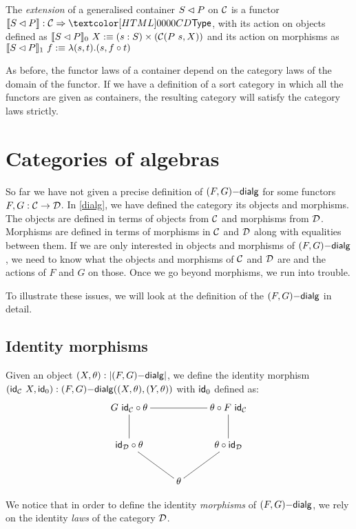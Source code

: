 \begin{definition}
  The \emph{extension} of a generalised container $S \lhd P$ on
  $\mathcal{C}$ is a functor $\context{\cont{S}{P}} : \Func{\Cc}{\Type}$, with
  its action on objects defined as
  $\llbracket S \lhd P \rrbracket_0\ X :\equiv (s : S) \times (\mathcal{C}(P\ s, X))$
  and its action on morphisms as
  $\llbracket S \lhd P \rrbracket_1\ f :\equiv \lambda (s , t) . (s , f \circ
  t)$
\end{definition}

As before, the functor laws of a container depend on the category laws
of the domain of the functor. If we have a definition of a sort
category in which all the functors are given as containers, the
resulting category will satisfy the category laws strictly.


\section{Categories of algebras}

So far we have not given a precise definition of $(F,G)\mathsf{-dialg}$ for
some functors $F, G : \mathcal{C} \to \mathcal{D}$. In \cref{dialg}, we have defined
the category its objects and morphisms. The objects are defined in
terms of objects from $\mathcal{C}$ and morphisms from $\mathcal{D}$. Morphisms are
defined in terms of morphisms in $\mathcal{C}$ and $\mathcal{D}$ along with equalities
between them. If we are only interested in objects and morphisms of
$(F,G)\mathsf{-dialg}$, we need to know what the objects and morphisms of
$\mathcal{C}$ and $\mathcal{D}$ are and the actions of $F$ and $G$ on those. Once we
go beyond morphisms, we run into trouble.

To illustrate these issues, we will look at the definition of the
$(F,G)\mathsf{-dialg}$ in detail. 

\subsection{Identity morphisms}

Given an object $(X,\theta) : | (F,G)\mathsf{-dialg} |$, we define the
identity morphism
$(\mathsf{id}_{\mathcal{C}}\ X , \mathsf{id}_0) : (F,G)\mathsf{-dialg}((X,\theta),(Y,\theta))$ with
$\mathsf{id}_0$ defined as:
$$
\xymatrix{
G\ \id_\Cc \circ \theta
\ar@{-}[rr]
\ar@{-}[d]
&
&\theta \circ F\ \id_\Cc
\ar@{-}[d]
\\
\id_\Dd \circ \theta
\ar@{-}[dr]
&
&\theta \circ \id_\Dd
\ar@{-}[dl]
\\
&\theta
&
}
$$

We notice that in order to define the identity \emph{morphisms} of
$(F,G)\mathsf{-dialg}$, we rely on the identity \emph{laws} of the category
$\mathcal{D}$. 

